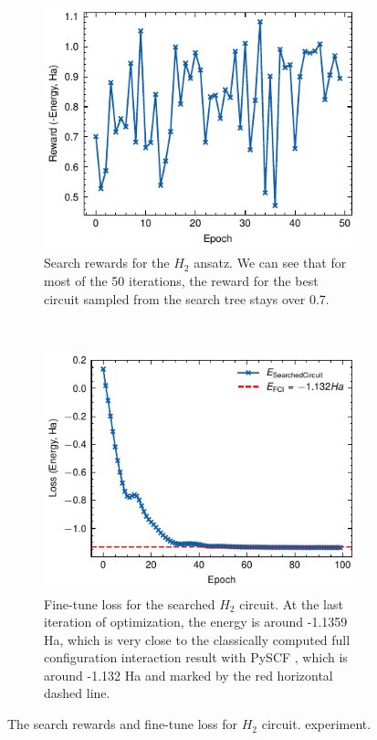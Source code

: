 \documentclass[a4paper,onecolumn,11pt]{quantumarticle}
\begin{document}
\begin{figure}[H]
    \centering
    \begin{subfigure}[t]{0.48\textwidth}
        \includegraphics[width=\textwidth]{Figures/fig_h2_vac_init_search_rewards.pdf}
        \caption{Search rewards for the $H_2$ ansatz. We can see that for most of the 50 iterations, the reward for the best circuit sampled from the search tree stays over 0.7.}
        \label{fig:h2_search}
    \end{subfigure}
    ~ %
    \begin{subfigure}[t]{0.48\textwidth}
        \includegraphics[width=\textwidth]{Figures/fig_h2_vac_init_fine_tune_loss.pdf}
        \caption{Fine-tune loss for the searched $H_2$ circuit. At the last iteration of optimization, the energy is around -1.1359 Ha, which is very close to the classically computed full configuration interaction result with PySCF \cite{Sun2018-nq, Sun2020-ej}, which is around -1.132 Ha and marked by the red horizontal dashed line.}
        \label{fig:h2_finetune}
    \end{subfigure}
    \caption{The search rewards and fine-tune loss for $H_2$ circuit. experiment.}\label{fig:h2_search_finetune}
\end{figure}
\end{document}
